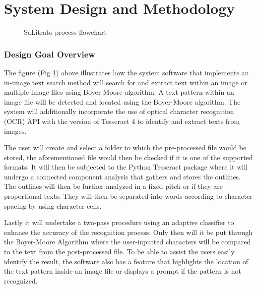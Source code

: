 \part{System Design and Methodology}


\begin{figure}[hbt!]
	\center
	\noindent{}
	\caption{SaLitrato process flowchart}
	\label{fig:salitrato_flowchart}
\end{figure}

\section*{Design Goal Overview}

\hspace\parindent
The figure (Fig \ref{fig:salitrato_flowchart}) above illustrates how the system software that implements an in-image text search method will search for and extract text within an image or multiple image files using Boyer-Moore algorithm. A text pattern within an image file will be detected and located using the Boyer-Moore algorithm. The system will additionally incorporate the use of optical character recognition (OCR) API with the version of Tesseract 4 to identify and extract texts from images.

\hfill

The user will create and select a folder to which the pre-processed file would be stored, the aforementioned file would then be checked if it is one of the supported formats. It will then be subjected to the Python Tesseract package where it will undergo a connected component analysis that gathers and stores the outlines. The outlines will then be further analyzed in a fixed pitch or if they are proportional texts. They will then be separated into words according to character spacing by using character cells.

\hfill

Lastly it will undertake a two-pass procedure using an adaptive classifier to enhance the accuracy of the recognition process. Only then will it be put through the Boyer-Moore Algorithm where the user-inputted characters will be compared to the text from the post-processed file. To be able to assist the users easily identify the result, the software also has a feature that highlights the location of the text pattern inside an image file or displays a prompt if the pattern is not recognized.

